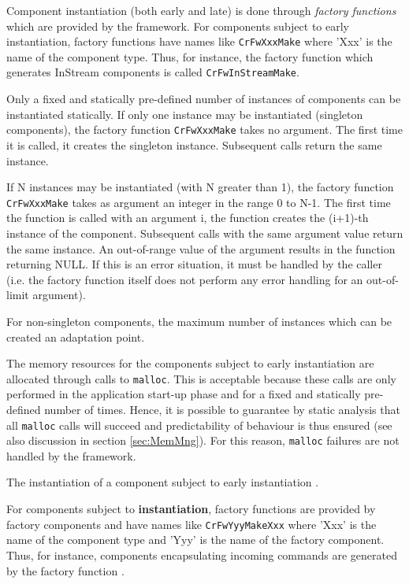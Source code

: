 \documentclass{pnp_article}
\begin{document}
Component instantiation (both early and late) is done through \textit{factory functions} which are provided by the framework. For components subject to early instantiation, factory functions have names like \texttt{CrFwXxxMake} where 'Xxx' is the name of the component type. Thus, for instance, the factory function which generates InStream components is called \texttt{CrFwInStreamMake}.  

Only a fixed and statically pre-defined number of instances of components can be instantiated statically. If only one instance may be instantiated (singleton components), the factory function \texttt{CrFwXxxMake} takes no argument. The first time it is called, it creates the singleton instance. Subsequent calls return the same instance.

If N instances may be instantiated (with N greater than 1), the factory function \texttt{CrFwXxxMake} takes as argument an integer in the range 0 to N-1. The first time the function is called with an argument i, the function creates the (i+1)-th instance of the component. Subsequent calls with the same argument value return the same instance. An out-of-range value of the argument results in the function returning NULL. If this is an error situation, it must be handled by the caller (i.e. the factory function itself does not perform any error handling for an out-of-limit argument).

For non-singleton components, the maximum number of instances which can be created  an adaptation point.

The memory resources for the components subject to early instantiation are allocated through calls to \texttt{malloc}. This is acceptable because these calls are only performed in the application start-up phase and for a fixed and statically pre-defined number of times. Hence, it is possible to guarantee by static analysis that all \texttt{malloc} calls will succeed and predictability of behaviour is thus ensured (see also discussion in section \ref{sec:MemMng}). For this reason, \texttt{malloc} failures are not handled by the framework.

The instantiation of a component subject to early instantiation . 

For components subject to \textbf{ instantiation}, factory functions are provided by factory components and have names like \texttt{CrFwYyyMakeXxx} where 'Xxx' is the name of the component type and 'Yyy' is the name of the factory component. Thus, for instance, components encapsulating incoming commands are generated by the factory function .  
\end{document}

